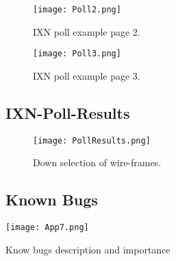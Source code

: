  \begin{figure}[H]
      \centering
      \texttt{[image: Poll2.png]}
      \caption{IXN poll example page 2.}
 \end{figure}

 \begin{figure}[H]
      \centering
      \texttt{[image: Poll3.png]}
      \caption{IXN poll example page 3.}
 \end{figure}

\subsection{IXN-Poll-Results}
\begin{figure}[H]
      \centering
      \texttt{[image: PollResults.png]}
      \caption{Down selection of wire-frames.}
 \end{figure}


 \newpage

\subsection{Known Bugs}
 \begin{table}[H]
      \centering
      \texttt{[image: App7.png]}
      \caption{Know bugs description and importance}
 \end{table}


